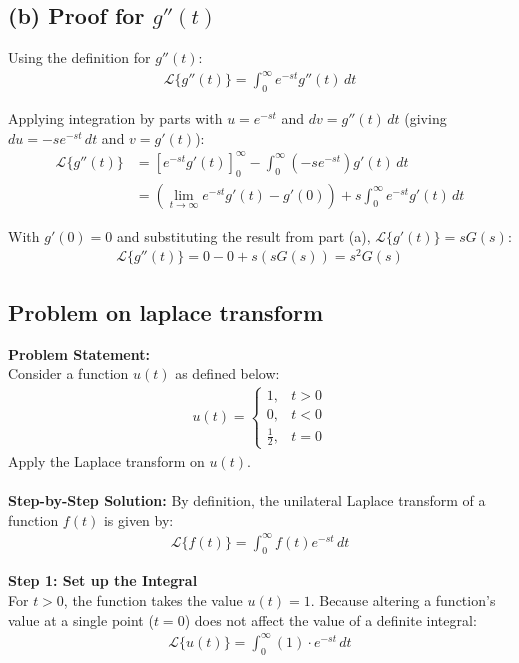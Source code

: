 \documentclass[journal,12pt,onecolumn]{IEEEtran}
\newcommand{\brak}[1]{\left(#1\right)}
\theoremstyle{remark}
\begin{document}
\subsection*{(b) Proof for $g''\brak{t}$}

\noindent Using the definition for $g''\brak{t}$:
\begin{align}
\mathcal{L}\{g''\brak{t}\} = \int_{0}^{\infty} e^{-st} g''\brak{t} \, dt
\end{align}

\noindent Applying integration by parts with $u = e^{-st}$ and $dv = g''\brak{t} \, dt$ (giving $du = -s e^{-st} \, dt$ and $v = g'\brak{t}$):
\begin{align}
\mathcal{L}\{g''\brak{t}\} &= \left[ e^{-st} g'\brak{t} \right]_{0}^{\infty} - \int_{0}^{\infty} \brak{-s e^{-st}} g'\brak{t} \, dt \\[1.5ex]
&= \left( \lim_{t \to \infty} e^{-st} g'\brak{t} - g'\brak{0} \right) + s \int_{0}^{\infty} e^{-st} g'\brak{t} \, dt
\end{align}

\noindent With $g'\brak{0} = 0$ and substituting the result from part (a), $\mathcal{L}\{g'\brak{t}\} = s G\brak{s}$:
\begin{align}
\mathcal{L}\{g''\brak{t}\} = 0 - 0 + s \brak{s G\brak{s}} = s^2 G\brak{s}
\end{align}
\subsection{Problem on laplace transform}
\noindent \textbf{Problem Statement:} \\
Consider a function $u\brak{t}$ as defined below:
\begin{align}
u\brak{t} = \begin{cases} 
1, & t > 0 \\ 
0, & t < 0 \\ 
\frac{1}{2}, & t = 0 
\end{cases}
\end{align}
Apply the Laplace transform on $u\brak{t}$.\\ \\
\textbf{Step-by-Step Solution:}
By definition, the unilateral Laplace transform of a function $f\brak{t}$ is given by:
\begin{align}
\mathcal{L}\{f\brak{t}\} = \int_{0}^{\infty} f\brak{t} e^{-st} \, dt
\end{align}

\noindent \textbf{Step 1: Set up the Integral} \\
For $t > 0$, the function takes the value $u\brak{t} = 1$. Because altering a function's value at a single point ($t = 0$) does not affect the value of a definite integral:
\begin{align}
\mathcal{L}\{u\brak{t}\} = \int_{0}^{\infty} \brak{1} \cdot e^{-st} \, dt
\end{align}
\end{document}
